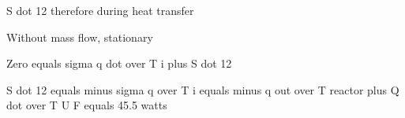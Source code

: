 S dot 12 therefore during heat transfer

Without mass flow, stationary

Zero equals sigma q dot over T i plus S dot 12

S dot 12 equals minus sigma q over T i equals minus q out over T reactor plus Q dot over T U F equals 45.5 watts